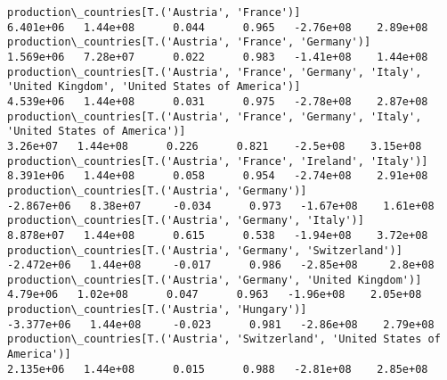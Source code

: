 \documentclass[11pt]{article}
\begin{document}
\begin{Verbatim}[commandchars=\\\{\}]
production\_countries[T.('Austria', 'France')]                                                                                                                                          6.401e+06   1.44e+08      0.044      0.965   -2.76e+08    2.89e+08
production\_countries[T.('Austria', 'France', 'Germany')]                                                                                                                               1.569e+06   7.28e+07      0.022      0.983   -1.41e+08    1.44e+08
production\_countries[T.('Austria', 'France', 'Germany', 'Italy', 'United Kingdom', 'United States of America')]                                                                        4.539e+06   1.44e+08      0.031      0.975   -2.78e+08    2.87e+08
production\_countries[T.('Austria', 'France', 'Germany', 'Italy', 'United States of America')]                                                                                           3.26e+07   1.44e+08      0.226      0.821    -2.5e+08    3.15e+08
production\_countries[T.('Austria', 'France', 'Ireland', 'Italy')]                                                                                                                      8.391e+06   1.44e+08      0.058      0.954   -2.74e+08    2.91e+08
production\_countries[T.('Austria', 'Germany')]                                                                                                                                        -2.867e+06   8.38e+07     -0.034      0.973   -1.67e+08    1.61e+08
production\_countries[T.('Austria', 'Germany', 'Italy')]                                                                                                                                8.878e+07   1.44e+08      0.615      0.538   -1.94e+08    3.72e+08
production\_countries[T.('Austria', 'Germany', 'Switzerland')]                                                                                                                         -2.472e+06   1.44e+08     -0.017      0.986   -2.85e+08     2.8e+08
production\_countries[T.('Austria', 'Germany', 'United Kingdom')]                                                                                                                        4.79e+06   1.02e+08      0.047      0.963   -1.96e+08    2.05e+08
production\_countries[T.('Austria', 'Hungary')]                                                                                                                                        -3.377e+06   1.44e+08     -0.023      0.981   -2.86e+08    2.79e+08
production\_countries[T.('Austria', 'Switzerland', 'United States of America')]                                                                                                         2.135e+06   1.44e+08      0.015      0.988   -2.81e+08    2.85e+08

\end{Verbatim}
\end{document}
